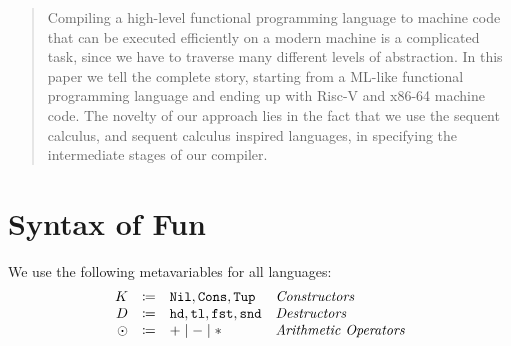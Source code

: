 \documentclass[nonacm]{acmart}
\begin{document}
\author{Jonathan Immanuel Brachthäuser}

\author{Klaus Ostermann}

\begin{abstract}
  Compiling a high-level functional programming language to machine code that can be executed efficiently on a modern machine is a complicated task, since we have to traverse many different levels of abstraction.
  In this paper we tell the complete story, starting from a ML-like functional programming language and ending up with Risc-V and x86-64 machine code.
  The novelty of our approach lies in the fact that we use the sequent calculus, and sequent calculus inspired languages, in specifying the intermediate stages of our compiler.
\end{abstract}

\maketitle


\section{Syntax of Fun}
\label{sec:syntax-of-fun}

\begin{definition}
  We use the following metavariables for all languages:
  \[
    \begin{array}{rcll}
      K & \coloneqq & \mathtt{Nil}, \mathtt{Cons}, \mathtt{Tup} & \emph{Constructors}\\
      D & \coloneqq & \mathtt{hd}, \mathtt{tl}, \mathtt{fst}, \mathtt{snd} & \emph{Destructors}\\
      \odot  & \coloneqq & + \mid - \mid * & \emph{Arithmetic Operators}
    \end{array}
  \]
\end{definition}
\end{document}
